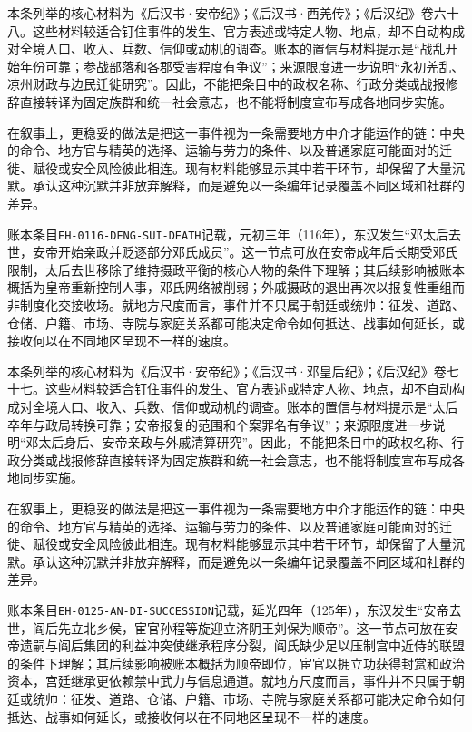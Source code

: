 本条列举的核心材料为《后汉书·安帝纪》；《后汉书·西羌传》；《后汉纪》卷六十八。这些材料较适合钉住事件的发生、官方表述或特定人物、地点，却不自动构成对全境人口、收入、兵数、信仰或动机的调查。账本的置信与材料提示是“战乱开始年份可靠；参战部落和各郡受害程度有争议”；来源限度进一步说明“永初羌乱、凉州财政与边民迁徙研究”。因此，不能把条目中的政权名称、行政分类或战报修辞直接转译为固定族群和统一社会意志，也不能将制度宣布写成各地同步实施。

在叙事上，更稳妥的做法是把这一事件视为一条需要地方中介才能运作的链：中央的命令、地方官与精英的选择、运输与劳力的条件、以及普通家庭可能面对的迁徙、赋役或安全风险彼此相连。现有材料能够显示其中若干环节，却保留了大量沉默。承认这种沉默并非放弃解释，而是避免以一条编年记录覆盖不同区域和社群的差异。

账本条目\texttt{EH-0116-DENG-SUI-DEATH}记载，元初三年（116年），东汉发生“邓太后去世，安帝开始亲政并贬逐部分邓氏成员”。这一节点可放在安帝成年后长期受邓氏限制，太后去世移除了维持摄政平衡的核心人物的条件下理解；其后续影响被账本概括为皇帝重新控制人事，邓氏网络被削弱；外戚摄政的退出再次以报复性重组而非制度化交接收场。就地方尺度而言，事件并不只属于朝廷或统帅：征发、道路、仓储、户籍、市场、寺院与家庭关系都可能决定命令如何抵达、战事如何延长，或接收何以在不同地区呈现不一样的速度。

本条列举的核心材料为《后汉书·安帝纪》；《后汉书·邓皇后纪》；《后汉纪》卷七十七。这些材料较适合钉住事件的发生、官方表述或特定人物、地点，却不自动构成对全境人口、收入、兵数、信仰或动机的调查。账本的置信与材料提示是“太后卒年与政局转换可靠；安帝报复的范围和个案罪名有争议”；来源限度进一步说明“邓太后身后、安帝亲政与外戚清算研究”。因此，不能把条目中的政权名称、行政分类或战报修辞直接转译为固定族群和统一社会意志，也不能将制度宣布写成各地同步实施。

在叙事上，更稳妥的做法是把这一事件视为一条需要地方中介才能运作的链：中央的命令、地方官与精英的选择、运输与劳力的条件、以及普通家庭可能面对的迁徙、赋役或安全风险彼此相连。现有材料能够显示其中若干环节，却保留了大量沉默。承认这种沉默并非放弃解释，而是避免以一条编年记录覆盖不同区域和社群的差异。

账本条目\texttt{EH-0125-AN-DI-SUCCESSION}记载，延光四年（125年），东汉发生“安帝去世，阎后先立北乡侯，宦官孙程等旋迎立济阴王刘保为顺帝”。这一节点可放在安帝遗嗣与阎后集团的利益冲突使继承程序分裂，阎氏缺少足以压制宫中近侍的联盟的条件下理解；其后续影响被账本概括为顺帝即位，宦官以拥立功获得封赏和政治资本，宫廷继承更依赖禁中武力与信息通道。就地方尺度而言，事件并不只属于朝廷或统帅：征发、道路、仓储、户籍、市场、寺院与家庭关系都可能决定命令如何抵达、战事如何延长，或接收何以在不同地区呈现不一样的速度。


